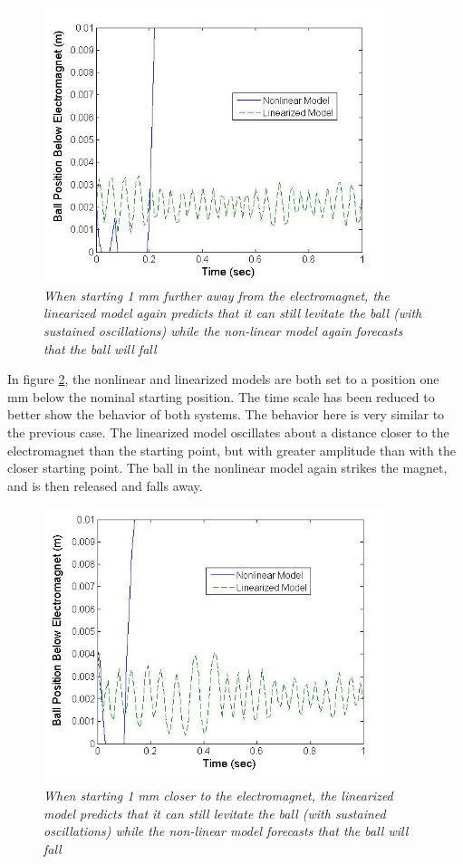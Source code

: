 \documentclass{article}
\theoremstyle{plain}
\theoremstyle{definition}
\theoremstyle{remark}
\begin{document}
\begin{figure}
\begin{center}
\includegraphics[width = 10cm]{Part1fCloseDisturbance}
\caption{\emph{When starting 1 mm further away from the electromagnet, the linearized model again predicts that it can still levitate the ball (with sustained oscillations) while the non-linear model again forecasts that the ball will fall}}
\label{Q1_f2}
\end{center}
\end{figure}

In figure \ref{Q1_f3}, the nonlinear and linearized models are both set to a position one mm below the nominal starting position. The time scale has been reduced to better show the behavior of both systems. The behavior here is very similar to the previous case. The linearized model oscillates about a distance closer to the electromagnet than the starting point, but with greater amplitude than with the closer starting point. The ball in the nonlinear model again strikes the magnet, and is then released and falls away.  

\begin{figure}[htb]
\begin{center}
\includegraphics[width = 10cm]{Part1fFarDisturbance}
\caption{\emph{When starting 1 mm closer to the electromagnet, the linearized model predicts that it can still levitate the ball (with sustained oscillations) while the non-linear model forecasts that the ball will fall}}
\label{Q1_f3}
\end{center}
\end{figure}
\end{document}
